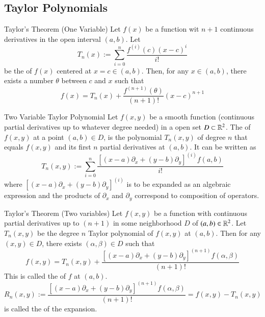 \documentclass[12pt]{report}
\begin{document}
\begin{appendices}
    
    \subsection{Taylor Polynomials}
    
    \begin{namthm}{Taylor's Theorem (One Variable)}
        Let $f(x)$ be a function wit $n+1$ continuous derivatives in the open interval $(a,b)$. Let \begin{equation}
            T_n(x) := \sum\limits_{i=0}^n\frac{f^{(i)}(c)(x-c)^i}{i!}
        \end{equation}
        be the  of $f(x)$ centered at $x = c \in (a,b)$. Then, for any $x \in (a,b)$, there exists a number $\theta$ between $c$ and $x$ such that \begin{equation}
            f(x) = T_n(x) + \frac{f^{(n+1)}(\theta)}{(n+1)!}(x-c)^{n+1}
        \end{equation}
    \end{namthm}
    
    \begin{defn}{Two Variable Taylor Polynomial}{}
        Let $f(x,y)$ be a smooth function (continuous partial derivatives up to whatever degree needed) in a open set $D \subset \mathbb R^2$. The  of $f(x,y)$ at a point $(a,b) \in D$, is the polynomial $T_n(x,y)$ of degree $n$ that equals $f(x,y)$ and its first $n$ partial derivatives at $(a,b)$. It can be written as \begin{equation}
            T_n(x,y) := \sum\limits_{i=0}^n\frac{\left[(x-a)\partial_x + (y-b)\partial_y\right]^{(i)}f(a,b)}{i!}
        \end{equation}
        where $\left[(x-a)\partial_x + (y-b)\partial_y\right]^{(i)}$ is to be expanded as an algebraic expression and the products of $\partial_x$ and $\partial_y$ correspond to composition of operators.
    \end{defn}
    
    \begin{namthm}{Taylor's Theorem (Two variables)}
        Let $f(x,y)$ be a function with continuous partial derivatives up to $(n+1)$ in some neighborhood $D$ of $(a,b) \in \mathbb R^2$. Let $T_n(x,y)$ be the degree $n$ Taylor polynomial of $f(x,y)$ at $(a,b)$. Then for any $(x,y) \in D$, there exists $(\alpha,\beta) \in D$ such that \begin{equation}
            f(x,y) = T_n(x,y) + \frac{\left[(x-a)\partial_x + (y-b)\partial_y\right]^{(n+1)}f(\alpha,\beta)}{(n+1)!}
        \end{equation}
        This is called the  of $f$ at $(a,b)$. \begin{equation}
            R_n(x,y) := \frac{\left[(x-a)\partial_x + (y-b)\partial_y\right]^{(n+1)}f(\alpha,\beta)}{(n+1)!} = f(x,y) - T_n(x,y)
        \end{equation}
        is called the  of the expansion.
    \end{namthm}
    

\end{appendices}
\end{document}
